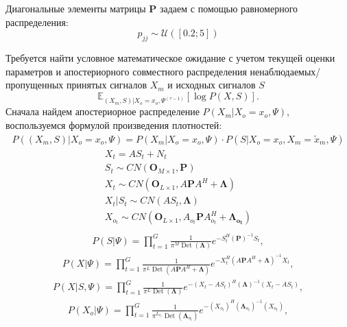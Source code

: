 \documentclass[11pt]{article}
\newcommand{\Expect}{\mathbb{E}}
\DeclareMathOperator{\Det}{Det}
\begin{document}
Диагональные элементы матрицы $\mathbf{P}$ задаем с помощью равномерного распределения:
\begin{equation}
p_{jj} \sim \mathcal{U}([0.2; 5])
\end{equation}
\begin{center}
\fontsize{14}{18}\selectfont {}
\end{center}
Требуется найти условное математическое ожидание с учетом  текущей оценки параметров и апостериорного совместного распределения ненаблюдаемых/пропущенных принятых сигналов $X_m$ и исходных сигналов $S$ 
\begin{equation}
 \Expect_{(X_m,S)|X_o=x_o, \Psi^{(\tau-1)}}[\log P(X, S)].
\end{equation}
Сначала найдем апостериорное распределение $P(X_m|X_o=x_o,\Psi)$, воспользуемся формулой произведения плотностей:
\begin{gather}
P((X_m,S)|X_o=x_o,\Psi) = P(X_m|X_o = x_o, \Psi) \cdot P(S|X_o = x_o, X_m=\widetilde{x}_m, \Psi)
\end{gather}
\begin{gather*}
X_t = AS_t + N_t \\
S_t \sim CN(\mathbf{O}_{M \times 1}, \mathbf{P}) \\
X_t \sim CN(\mathbf{O}_{L \times 1}, A\mathbf{P}A^H + \mathbf{\Lambda})\\
X_t|S_t \sim CN(AS_t,  \mathbf{\Lambda})\\
X_{o_t} \sim CN(\mathbf{O}_{L \times 1}, A_{o_t}\mathbf{P}A_{o_t}^H + \mathbf{\Lambda_{o_t}})\\
\end{gather*}
\begin{gather}
P(S|\Psi) = \prod_{t=1}^G \frac{1}{\pi^M \Det(\mathbf{\Lambda})}e^{-S_t^H (\mathbf{P})^{-1}S_t},
\end{gather}
\begin{gather}
P(X|\Psi) = \prod_{t=1}^G \frac{1}{ \pi^L \Det(A\mathbf{P}A^H + \mathbf{\Lambda}) } e^{-X_t^H (A\mathbf{P}A^H + \mathbf{\Lambda})^{-1}X_t},
\end{gather}
\begin{gather}
P(X|S,\Psi) = \prod_{t=1}^G \frac{1}{\pi^L \Det(\mathbf{\Lambda}) }e^{-(X_t-AS_t)^H (\mathbf{\Lambda})^{-1}(X_t-AS_t)},
\end{gather}
\begin{gather}
P(X_o|\Psi) = \prod_{t=1}^G \frac{1}{\pi^{L_{o_t}} \Det(\mathbf{\Lambda}_{o_t})}e^{-(X_{o_t})^H (\mathbf{\Lambda}_{o_t})^{-1}(X_{o_t})},
\end{gather}
\end{document}
